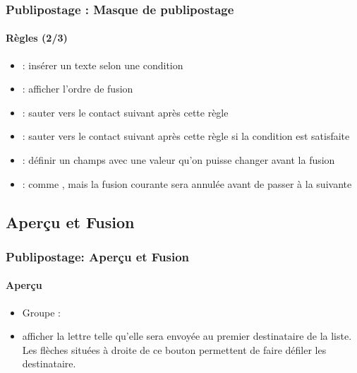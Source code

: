 \documentclass[xcolor=table]{beamer}
\begin{document}
\begin{frame}
\frametitle{Publipostage : Masque de publipostage}
\framesubtitle{Règles (2/3)}

\begin{minipage}{0.63\textwidth}
	\begin{itemize}
		\item {} : insérer un texte selon une condition
		\item {} : afficher l'ordre de fusion
		\item {} : sauter vers le contact suivant après cette règle
		\item {} : sauter vers le contact suivant après cette règle si la condition est satisfaite
		\item {} : définir un champs avec une valeur qu'on puisse changer avant la fusion
		\item {} : comme , mais la fusion courante sera annulée avant de passer à la suivante
	\end{itemize}
\end{minipage}
\begin{minipage}{0.36\textwidth}
	
	
	
\end{minipage}

\end{frame}

\subsection{Aperçu et Fusion}

\begin{frame}
\frametitle{Publipostage: Aperçu et Fusion}
\framesubtitle{Aperçu}

\begin{minipage}{0.74\textwidth}
	\begin{itemize}
		\item Groupe : 
		\item afficher la lettre telle qu'elle sera envoyée au premier destinataire de la liste. Les flèches situées à droite de ce bouton permettent de faire défiler les destinataire.
	\end{itemize}
\end{minipage}
\begin{minipage}{0.25\textwidth}
\end{minipage}

\vfill

\hfill
{}

\end{frame}
\end{document}
